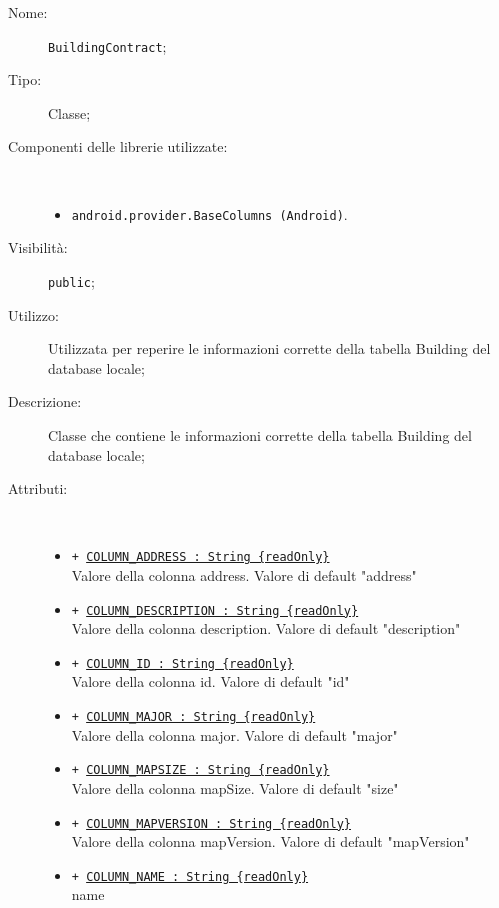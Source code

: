 \documentclass[../DefinizioneDiProdotto.tex]{subfiles}
\begin{document}
\begin{description}
	\item[Nome:] \texttt{BuildingContract};
	\item[Tipo:] Classe;
	\item[Componenti delle librerie utilizzate:] \
	\begin{itemize}
		\item \texttt{android.provider.BaseColumns (Android)}.
		
	\end{itemize}
	\item[Visibilità:] \texttt{public};
	\item[Utilizzo:] Utilizzata per reperire le informazioni corrette della tabella Building del database locale;
	\item[Descrizione:] Classe che contiene le informazioni corrette della tabella Building del database locale;
	\item[Attributi:] \
	\begin{itemize}
		\item \texttt{+ \underline{COLUMN\_ADDRESS : String \{readOnly\}}}\\
		Valore della colonna address. Valore di default "address"
		
		\item \texttt{+ \underline{COLUMN\_DESCRIPTION : String \{readOnly\}}}\\
		Valore della colonna description. Valore di default "description"
		
		\item \texttt{+ \underline{COLUMN\_ID : String \{readOnly\}}}\\
		Valore della colonna id. Valore di default "id"
		
		\item \texttt{+ \underline{COLUMN\_MAJOR : String \{readOnly\}}}\\
		Valore della colonna major. Valore di default "major"
		
		\item \texttt{+ \underline{COLUMN\_MAPSIZE : String \{readOnly\}}}\\
		Valore della colonna mapSize. Valore di default "size"
		
		\item \texttt{+ \underline{COLUMN\_MAPVERSION : String \{readOnly\}}}\\
		Valore della colonna mapVersion. Valore di default "mapVersion"
		
		\item \texttt{+ \underline{COLUMN\_NAME : String \{readOnly\}}}\\
		name
		

\end{itemize}
\end{description}
\end{document}
